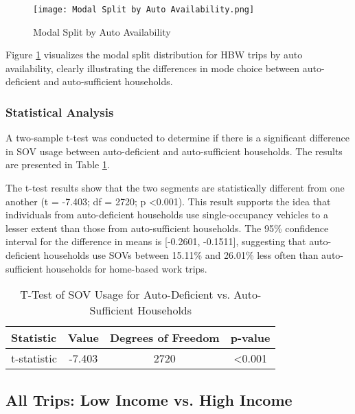 \begin{figure} [h!]
    \centering
    \texttt{[image: Modal Split by Auto Availability.png]}
    \caption{Modal Split by Auto Availability}
    \label{fig:Modal Split by Auto Availability}
\end{figure}

Figure \ref{fig:Modal Split by Auto Availability} visualizes the modal split distribution for HBW trips by auto availability, clearly illustrating the differences in mode choice between auto-deficient and auto-sufficient households.

\subsubsection{Statistical Analysis}

A two-sample t-test was conducted to determine if there is a significant difference in SOV usage between auto-deficient and auto-sufficient households. The results are presented in Table \ref{tab:T-Test of SOV Usage for Auto-Deficient vs. Auto-Sufficient Households}.

The t-test results show that the two segments are statistically different from one another (t = -7.403; df = 2720; p \textless 0.001). This result supports the idea that individuals from auto-deficient households use single-occupancy vehicles to a lesser extent than those from auto-sufficient households. The 95\% confidence interval for the difference in means is [-0.2601, -0.1511], suggesting that auto-deficient households use SOVs between 15.11\% and 26.01\% less often than auto-sufficient households for home-based work trips.




\begin{table}[h!]
\centering
\caption{T-Test of SOV Usage for Auto-Deficient vs. Auto-Sufficient Households}
\label{tab:T-Test of SOV Usage for Auto-Deficient vs. Auto-Sufficient Households}
\begin{tabular}{@{}lccc@{}}
\toprule
Statistic & Value & Degrees of Freedom & p-value \\ \midrule
t-statistic & -7.403 & 2720 & \textless 0.001 \\
\bottomrule
\end{tabular}
\end{table}






\subsection{All Trips: Low Income vs. High Income}

